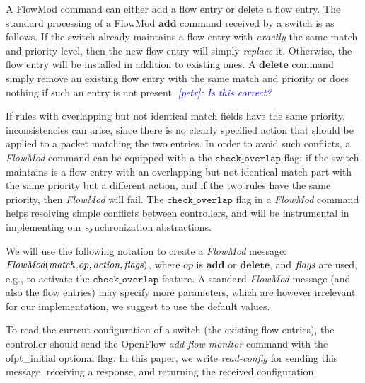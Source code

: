 \documentclass[conference]{sigcomm-alternate}
\newcommand{\hide}[1]{}
\newcommand{\add}{\textbf{add}\xspace}
\newcommand{\dele}{\textbf{delete}\xspace}
\newcommand{\FlowMod}{\emph{FlowMod}\xspace}
\newcommand{\match}{\emph{match}\xspace}
\newcommand{\action}{\emph{action}\xspace}
\newcommand{\flags}{\emph{flags}\xspace}
\newcommand{\checko}{\texttt{check\_overlap}\xspace}
\newcommand{\petr}[1]{\textit{\textcolor{blue}{[petr]: #1}}} %
\begin{document}
A FlowMod command can either add a flow entry or delete a flow entry.
The standard processing of a FlowMod $\add$ command received by a switch is
as follows. 
If the switch already maintains a flow entry with \emph{exactly} the
same match and priority level, then the new flow entry will simply \emph{replace} it.
Otherwise, the flow entry will be installed in addition to existing
ones.
A $\dele$ command simply remove an existing flow entry with the same
match and priority  or does nothing if such an entry is not present.
\petr{Is this correct?}


If rules with overlapping but not identical match fields have the same priority, 
inconsistencies can arise, since there is no clearly specified action
that should be applied to a packet matching the two entries.
In order to avoid such conflicts, a \emph{FlowMod} command can be equipped with a the $\checko$ flag:
if the switch maintains is a flow entry with an overlapping but not
identical match part with the same priority but a different action,
 and if the two rules have the same priority, then
\emph{FlowMod} will fail.
The $\checko$ flag in a \emph{FlowMod} command helps resolving simple
conflicts between controllers, and will be instrumental
in implementing our synchronization abstractions.  

We will use the following notation to create a \emph{FlowMod} message:
$\FlowMod(\match, op, \action, \flags)$, where 
$op$ is $\add$ or $\dele$, and $\flags$ are used, e.g.,  to activate the $\checko$
feature.
A standard \emph{FlowMod} message (and also the flow entries) may specify
more parameters, which are however irrelevant for our implementation, we suggest to
use the default values.

To read the current configuration of a switch (the existing flow entries), the controller should send
the OpenFlow \emph{add flow monitor} command with the \textsf{ofpt\_initial} optional flag.
In this paper, we write \textit{read-config} for sending 
this message, receiving a response, and returning the received configuration.

\hide{
We also remark that our solution is only based on flow tables
and does not make use
of \emph{OpenFlow group tables}, nor do we make use of \emph{cookies}: rules
are always identified by exact matches.
}
\end{document}
